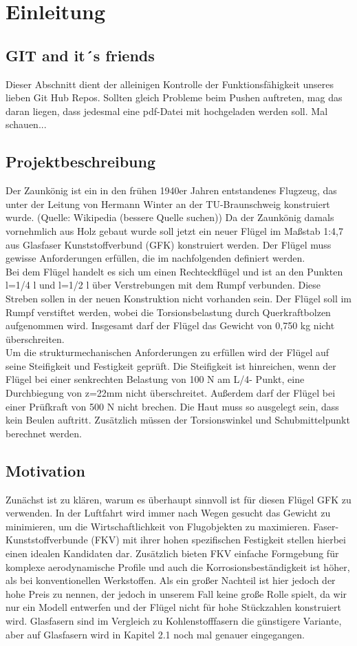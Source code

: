\documentclass[a4paper,12p]{article}
\begin{document}
\tableofcontents
\section{Einleitung}

\subsection{GIT and it´s friends}
Dieser Abschnitt dient der alleinigen Kontrolle der Funktionsfähigkeit unseres lieben Git Hub Repos. Sollten gleich Probleme beim Pushen auftreten, mag das daran liegen, dass jedesmal eine pdf-Datei mit hochgeladen werden soll. Mal schauen...

\subsection{Projektbeschreibung}
Der Zaunkönig ist ein in den frühen 1940er Jahren entstandenes Flugzeug, das unter der Leitung von Hermann Winter an der TU-Braunschweig konstruiert wurde. (Quelle: Wikipedia (bessere Quelle suchen)) Da der Zaunkönig damals vornehmlich aus Holz gebaut wurde soll jetzt ein neuer Flügel im Maßstab 1:4,7 aus Glasfaser Kunststoffverbund (GFK) konstruiert werden. Der Flügel muss gewisse Anforderungen erfüllen, die im nachfolgenden definiert werden.\\
Bei dem Flügel handelt es sich um einen Rechteckflügel und ist an den Punkten l=1/4 l und l=1/2 l über Verstrebungen mit dem Rumpf verbunden. Diese Streben sollen in der neuen Konstruktion nicht vorhanden sein. Der Flügel soll im Rumpf verstiftet werden, wobei die Torsionsbelastung durch Querkraftbolzen aufgenommen wird. Insgesamt darf der Flügel das Gewicht von 0,750 kg nicht überschreiten.\\
Um die strukturmechanischen Anforderungen zu erfüllen wird der Flügel auf seine Steifigkeit und Festigkeit geprüft. Die Steifigkeit ist hinreichen, wenn der Flügel bei einer senkrechten Belastung von 100 N am L/4- Punkt, eine Durchbiegung von z=22mm nicht überschreitet. Außerdem darf der Flügel bei einer Prüfkraft von 500 N nicht brechen. Die Haut muss so ausgelegt sein, dass kein Beulen auftritt. Zusätzlich müssen der Torsionswinkel und Schubmittelpunkt berechnet werden.

\subsection{Motivation}
Zunächst ist zu klären, warum es überhaupt sinnvoll ist für diesen Flügel GFK zu verwenden. In der Luftfahrt wird immer nach Wegen gesucht das Gewicht zu minimieren, um die Wirtschaftlichkeit von Flugobjekten zu maximieren. Faser-Kunststoffverbunde (FKV) mit ihrer hohen spezifischen Festigkeit stellen hierbei einen idealen Kandidaten dar. Zusätzlich bieten FKV einfache Formgebung für komplexe aerodynamische Profile und auch die Korrosionsbeständigkeit ist höher, als bei konventionellen Werkstoffen. Als ein großer Nachteil ist hier jedoch der hohe Preis zu nennen, der jedoch in unserem Fall keine große Rolle spielt, da wir nur ein Modell entwerfen und der Flügel nicht für hohe Stückzahlen konstruiert wird. Glasfasern sind im Vergleich zu Kohlenstofffasern die günstigere Variante, aber auf Glasfasern wird in Kapitel 2.1 noch mal genauer eingegangen.
\end{document}
